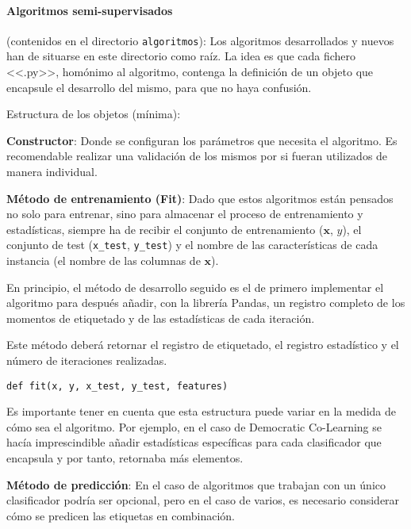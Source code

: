 \paragraph{Algoritmos semi-supervisados} (contenidos en el directorio
\texttt{algoritmos}): Los algoritmos desarrollados y nuevos han de situarse en
este directorio como raíz. La idea es que cada fichero <<.py>>, homónimo al
algoritmo, contenga la definición de un objeto que encapsule el desarrollo del
mismo, para que no haya confusión.

Estructura de los objetos (mínima):

\textbf{Constructor}: Donde se configuran los parámetros que necesita el algoritmo. Es
recomendable realizar una validación de los mismos por si fueran utilizados de manera individual.

\textbf{Método de entrenamiento (Fit)}: Dado que estos algoritmos están pensados
no solo para entrenar, sino para almacenar el proceso de entrenamiento y
estadísticas, siempre ha de recibir el conjunto de entrenamiento ($\mathbf{x}$,
$y$), el conjunto de test (\texttt{x\_test}, \texttt{y\_test}) y el nombre de
las características de cada instancia (el nombre de las columnas de
$\mathbf{x}$).

En principio, el método de desarrollo seguido es el de primero implementar el
algoritmo para después añadir, con la librería Pandas, un registro completo de
los momentos de etiquetado y de las estadísticas de cada iteración.

Este método deberá retornar el registro de etiquetado, el registro estadístico y el
número de iteraciones realizadas.

\begin{tcolorbox}[colback=cyan!5!white,colframe=cyan!75!black,title=Cabecera fit]
\begin{verbatim}
def fit(x, y, x_test, y_test, features)
\end{verbatim}
\end{tcolorbox}

Es importante tener en cuenta que esta estructura puede variar en la medida de
cómo sea el algoritmo. Por ejemplo, en el caso de Democratic Co-Learning se
hacía imprescindible añadir estadísticas específicas para cada clasificador que
encapsula y por tanto, retornaba más elementos.

\textbf{Método de predicción}: En el caso de algoritmos que trabajan con un único
clasificador podría ser opcional, pero en el caso de varios, es necesario
considerar cómo se predicen las etiquetas en combinación.

